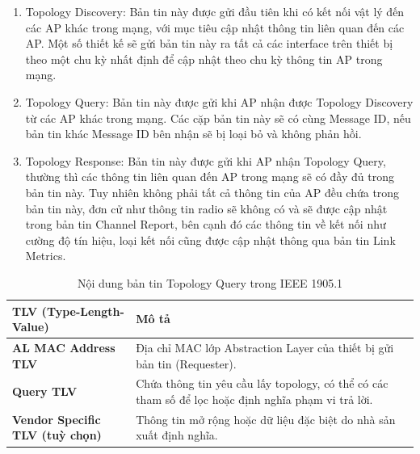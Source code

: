\begin{enumerate}
    \item Topology Discovery: Bản tin này được gửi đầu tiên khi có kết nối vật lý đến các AP khác trong mạng, với mục tiêu cập nhật thông tin liên quan đến các AP. Một số thiết kế sẽ gửi bản tin này ra tất cả các interface trên thiết bị theo một chu kỳ nhất định để cập nhật theo chu kỳ thông tin AP trong mạng.
    \item Topology Query: Bản tin này được gửi khi AP nhận được Topology Discovery từ các AP khác trong mạng. Các cặp bản tin này sẽ có cùng Message ID, nếu bản tin khác Message ID bên nhận sẽ bị loại bỏ và không phản hồi.
    \item Topology Response: Bản tin này được gửi khi AP nhận Topology Query, thường thì các thông tin liên quan đến AP trong mạng sẽ có đầy đủ trong bản tin này. Tuy nhiên không phải tất cả thông tin của AP đều chứa trong bản tin này, đơn cử như thông tin radio sẽ không có và sẽ được cập nhật trong bản tin Channel Report, bên cạnh đó các thông tin về kết nối như cường độ tín hiệu, loại kết nối cũng được cập nhật thông qua bản tin Link Metrics.
\end{enumerate}

\begin{table}[ht]
    \centering
    \caption{Nội dung bản tin Topology Query trong IEEE 1905.1}
    \begin{tabular}{|>{\raggedright\arraybackslash}m{5cm}|>{\raggedright\arraybackslash}m{8cm}|}
    \hline
    \textbf{TLV (Type-Length-Value)} & \textbf{Mô tả} \\
    \hline
    \textbf{AL MAC Address TLV} & Địa chỉ MAC lớp Abstraction Layer của thiết bị gửi bản tin (Requester). \\
    \hline
    \textbf{Query TLV} & Chứa thông tin yêu cầu lấy topology, có thể có các tham số để lọc hoặc định nghĩa phạm vi trả lời. \\
    \hline
    \textbf{Vendor Specific TLV (tuỳ chọn)} & Thông tin mở rộng hoặc dữ liệu đặc biệt do nhà sản xuất định nghĩa. \\
    \hline
    \end{tabular}
\end{table}
    

